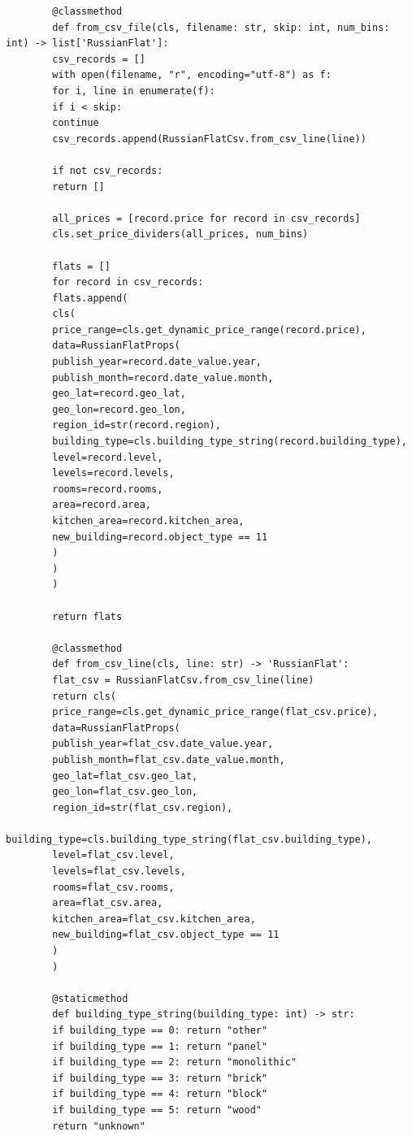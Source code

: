 \documentclass[12pt,a4paper]{article}
\begin{document}
\begin{lstlisting}
		@classmethod
		def from_csv_file(cls, filename: str, skip: int, num_bins: int) -> list['RussianFlat']:
		csv_records = []
		with open(filename, "r", encoding="utf-8") as f:
		for i, line in enumerate(f):
		if i < skip:
		continue
		csv_records.append(RussianFlatCsv.from_csv_line(line))
		
		if not csv_records:
		return []
		
		all_prices = [record.price for record in csv_records]
		cls.set_price_dividers(all_prices, num_bins)
		
		flats = []
		for record in csv_records:
		flats.append(
		cls(
		price_range=cls.get_dynamic_price_range(record.price),
		data=RussianFlatProps(
		publish_year=record.date_value.year,
		publish_month=record.date_value.month,
		geo_lat=record.geo_lat,
		geo_lon=record.geo_lon,
		region_id=str(record.region),
		building_type=cls.building_type_string(record.building_type),
		level=record.level,
		levels=record.levels,
		rooms=record.rooms,
		area=record.area,
		kitchen_area=record.kitchen_area,
		new_building=record.object_type == 11
		)
		)
		)
		
		return flats
		
		@classmethod
		def from_csv_line(cls, line: str) -> 'RussianFlat':
		flat_csv = RussianFlatCsv.from_csv_line(line)
		return cls(
		price_range=cls.get_dynamic_price_range(flat_csv.price),
		data=RussianFlatProps(
		publish_year=flat_csv.date_value.year,
		publish_month=flat_csv.date_value.month,
		geo_lat=flat_csv.geo_lat,
		geo_lon=flat_csv.geo_lon,
		region_id=str(flat_csv.region),
		building_type=cls.building_type_string(flat_csv.building_type),
		level=flat_csv.level,
		levels=flat_csv.levels,
		rooms=flat_csv.rooms,
		area=flat_csv.area,
		kitchen_area=flat_csv.kitchen_area,
		new_building=flat_csv.object_type == 11
		)
		)
		
		@staticmethod
		def building_type_string(building_type: int) -> str:
		if building_type == 0: return "other"
		if building_type == 1: return "panel"
		if building_type == 2: return "monolithic"
		if building_type == 3: return "brick"
		if building_type == 4: return "block"
		if building_type == 5: return "wood"
		return "unknown"
	\end{lstlisting}
	
\end{document}
